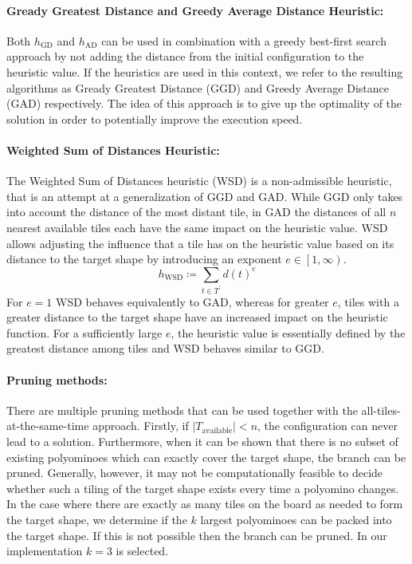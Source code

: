 \paragraph{Gready Greatest Distance and Greedy Average Distance Heuristic:}
Both $h_{\text{GD}}$ and $h_{\text{AD}}$ can be used in combination with a greedy best-first search approach by not adding the distance from the initial configuration to the heuristic value. If the heuristics are used in this context, we refer to the resulting algorithms as Gready Greatest Distance (GGD) and Greedy Average Distance (GAD) respectively. The idea of this approach is to give up the optimality of the solution in order to potentially improve the execution speed.

\paragraph{Weighted Sum of Distances Heuristic:}
The Weighted Sum of Distances heuristic (WSD) is a non-admissible heuristic, that is an attempt at a generalization of GGD and GAD. While GGD only takes into account the distance of the most distant tile, in GAD the distances of all $n$ nearest available tiles each have the same impact on the heuristic value. WSD allows adjusting the influence that a tile has on the heuristic value based on its distance to the target shape by introducing an exponent $e \in \left[1,\infty\right)$.
\begin{equation}
h_{\text{WSD}} \coloneqq \sum_{t \in T^\prime}{d(t)^e}
\end{equation}
For $e = 1$ WSD behaves equivalently to GAD, whereas for greater $e$, tiles with a greater distance to the target shape have an increased impact on the heuristic function. For a sufficiently large $e$, the heuristic value is essentially defined by the greatest distance among tiles and WSD behaves similar to GGD.

\paragraph{Pruning methods:}
There are multiple pruning methods that can be used together with the all-tiles-at-the-same-time approach. Firstly, if $|T_{\text{available}}| < n$, the configuration can never lead to a solution.
Furthermore, when it can be shown that there is no subset of existing polyominoes which can exactly cover the target shape, the branch can be pruned.
Generally, however, it may not be computationally feasible to decide whether such a tiling of the target shape exists every time a polyomino changes.
In the case where there are exactly as many tiles on the board as needed to form the target shape, we determine if the $k$ largest polyominoes can be packed into the target shape. If this is not possible then the branch can be pruned. In our implementation $k = 3$ is selected.


